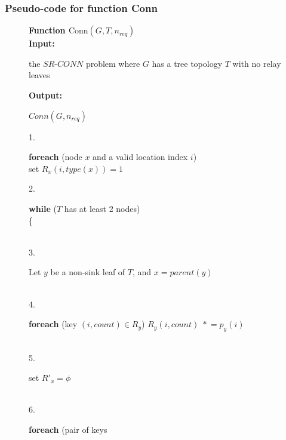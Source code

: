 \documentclass{beamer}
\newcommand{\fConn}   	{ {\mathrm {Conn}} }
\newcommand{\nReq}    { {n_{req}} }
\newcommand{\starEqual}   { {\;{\scriptstyle *} \! =} }
\newcommand{\iin}[1]    {\hspace*{#1in}}
\newcommand {\nwline} {\hfill\break}
\begin{document}
\begin{frame}
\frametitle{Pseudo-code for function Conn}
\vspace{-1.7em}
    \begin{figure}[htbp]
    \small
\begin{center}
    \begin{minipage}[t]{5 in}
    \renewcommand{\baselinestretch}{1}
    {\bf Function $\fConn (G, T, \nReq)$}\\
	{\bf Input:}
	\begin{minipage}[t]{5in}
	the $SR$-$CONN$ problem where $G$ has a tree
	topology $T$ with no relay leaves
	\end{minipage}
	{\bf Output:}
	\begin{minipage}[t]{5in}
	$Conn(G, \nReq)$
	\end{minipage}
%
   1.  \begin{minipage}[t]{5in}
       {\bf foreach} (node $x$ and a valid location index $i$) \\
         \iin{0.20} set $R_x(i, type(x) )= 1$ 
       \end{minipage}       
   2.  \begin{minipage}[t]{5in}
       {\bf while} ($T$ has at least 2 nodes) \\
       \{
       \end{minipage}
       \\
   3.  \iin{0.20} \begin{minipage}[t]{5 in}
   		  Let $y$ be a non-sink leaf of $T$, and $x= parent(y)$
		  \end{minipage}
		  \\
   4.  \iin{0.20} \begin{minipage}[t]{5 in}
   		  {\bf foreach} (key $(i,count) \in R_y$)
		       $R_y (i,count) \starEqual p_y(i)$
		  \end{minipage}
		  \\
   5.  \iin{0.20} \begin{minipage}[t]{5in}
   		  set $R'_x= \phi$
		  \end{minipage}
		  \\
   6.  \iin{0.20} \begin{minipage}[t]{5in}
   		  {\bf foreach} (pair of keys

\end{minipage}
\end{minipage}
\end{center}
\end{figure}
\end{frame}
\end{document}
